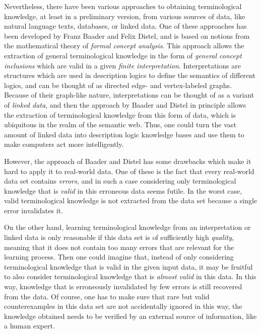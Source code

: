 Nevertheless, there have been various approaches to obtaining terminological knowledge, at
least in a preliminary version, from various sources of data, like natural language texts,
databases, or linked data.  One of these approaches has been developed by Franz Baader and
Felix Distel, and is based on notions from the mathematical theory of \emph{formal concept
  analysis}.  This approach allows the extraction of general terminological knowledge in
the form of \emph{general concept inclusions} which are valid in a given \emph{finite
  interpretation}.  Interpretations are structures which are used in description logics to
define the semantics of different logics, and can be thought of as directed edge- and
vertex-labeled graphs.  Because of their graph-like nature, interpretations can be thought
of as a variant of \emph{linked data}, and then the approach by Baader and Distel in
principle allows the extraction of terminological knowledge from this form of data, which
is ubiquitous in the realm of the semantic web.  Thus, one could turn the vast amount of
linked data into description logic knowledge bases and use them to make computers act more
intelligently.

However, the approach of Baader and Distel has some drawbacks which make it hard to apply
it to real-world data.  One of these is the fact that every real-world data set contains
\emph{errors}, and in such a case considering only terminological knowledge that is
\emph{valid} in this erroneous data seems futile.  In the worst case, valid terminological
knowledge is not extracted from the data set because a single error invalidates it.

On the other hand, learning terminological knowledge from an interpretation or linked data
is only reasonable if this data set is of sufficiently high \emph{quality}, meaning that
it does not contain too many errors that are relevant for the learning process.  Then one
could imagine that, instead of only considering terminological knowledge that is valid in
the given input data, it may be fruitful to also consider terminological knowledge that is
\emph{almost valid} in this data.  In this way, knowledge that is erroneously invalidated
by few errors is still recovered from the data.  Of course, one has to make sure that rare
but valid counterexamples in this data set are not accidentally ignored in this way, \ie
the knowledge obtained needs to be verified by an external source of information, like a
human expert.

